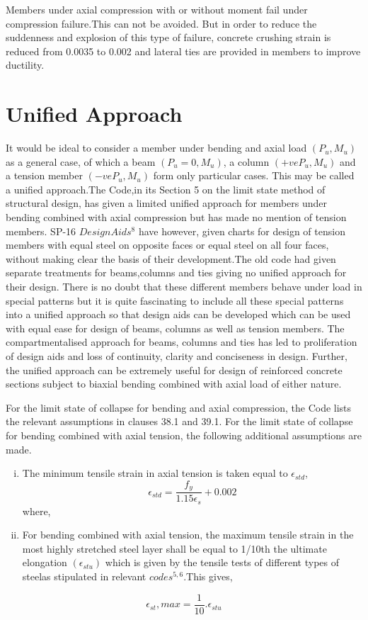 Members under axial compression with or without moment fail under
compression failure.This can not be avoided. But in order to reduce the
suddenness and explosion of this type of failure, concrete crushing
strain is reduced from 0.0035 to 0.002 and lateral ties are provided
in members to improve ductility.

\section{Unified Approach}

It would be ideal to consider a member under bending and axial load
$(P_u, M_u)$ as a general case, of which a beam $(P_u=0,M_u)$, a column
$(+ve P_u,M_u)$ and a tension member $(-ve P_u,M_u)$ form only particular
cases. This may be called a uniﬁed approach.The Code,in its Section 5 on
the limit state method of structural design, has given a limited uniﬁed
approach for members under bending combined with axial compression but
has made no mention of tension members. SP-16 $Design Aids^8$ have
however, given charts for design of tension members with equal steel on
opposite faces or equal steel on all four faces, without making clear the
basis of their development.The old code had given separate treatments for
beams,columns and ties giving no unified approach for their design. There
is no doubt that these different members behave under load in special
patterns but it is quite fascinating to include all these special
patterns into a unified approach so that design aids can be developed
which can be used with equal ease for design of beams, columns as well 
as tension members. The compartmentalised approach for beams, columns
and ties has led to proliferation of design aids and loss of continuity,
clarity and conciseness in design. Further, the unified approach can be
extremely useful for design of reinforced concrete sections subject to
biaxial bending combined with axial load of either nature.

For the limit state of collapse for bending and axial compression, the
Code lists the relevant assumptions in clauses 38.1 and 39.1. For the
limit state of collapse for bending combined with axial tension, the
following additional assumptions are made.

\begin{enumerate}[(i)]
\item The minimum tensile strain in axial tension is taken equal to
$\epsilon_{std}$,
\begin{equation}
\epsilon_{std}=\frac{f_y}{1.15{\epsilon_s}}+0.002
\end{equation}
where, 
\item  For bending combined with axial tension, the maximum tensile
strain in the most highly stretched steel layer shall be equal to 1/10th
the ultimate elongation $(\epsilon_{stu})$ which is given by the tensile
tests of different types of steelas stipulated in relevant
$codes^{5,6}$.This gives,
\end{enumerate}
\begin{equation}
\epsilon_{st},max=\frac{1}{10}.\epsilon_{stu}
\end{equation}

